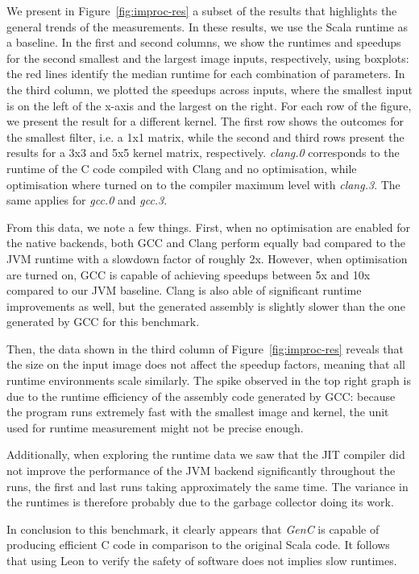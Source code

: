 \documentclass[a4paper,twoside]{article}
\newcommand{\GenC}{\emph{GenC}\xspace}
\newcommand{\RefFig}[1]{Figure~\ref{#1}}
\begin{document}
We present in \RefFig{fig:improc-res} a subset of the results that highlights
the general trends of the measurements. In these results, we use the Scala
runtime as a baseline. In the first and second columns, we show the runtimes and
speedups for the second smallest and the largest image inputs, respectively,
using boxplots: the red lines identify the median runtime for each combination
of parameters. In the third column, we plotted the speedups across inputs, where
the smallest input is on the left of the x-axis and the largest on the right.
For each row of the figure, we present the result for a different kernel. The
first row shows the outcomes for the smallest filter, i.e. a 1x1 matrix, while
the second and third rows present the results for a 3x3 and 5x5 kernel matrix,
respectively. \emph{clang.0} corresponds to the runtime of the C code compiled
with Clang and no optimisation, while optimisation where turned on to the
compiler maximum level with \emph{clang.3}. The same applies for \emph{gcc.0}
and \emph{gcc.3}.

From this data, we note a few things. First, when no optimisation are enabled
for the native backends, both GCC and Clang perform equally bad compared to the
JVM runtime with a slowdown factor of roughly 2x. However, when optimisation are
turned on, GCC is capable of achieving speedups between 5x and 10x compared to
our JVM baseline. Clang is also able of significant runtime improvements as
well, but the generated assembly is slightly slower than the one generated by
GCC for this benchmark.

Then, the data shown in the third column of \RefFig{fig:improc-res} reveals that
the size on the input image does not affect the speedup factors, meaning that
all runtime environments scale similarly. The spike observed in the top right
graph is due to the runtime efficiency of the assembly code generated by GCC:
because the program runs extremely fast with the smallest image and kernel, the
unit used for runtime measurement might not be precise enough.

Additionally, when exploring the runtime data we saw that the JIT compiler did
not improve the performance of the JVM backend significantly throughout the
runs, the first and last runs taking approximately the same time. The variance
in the runtimes is therefore probably due to the garbage collector doing its
work.

In conclusion to this benchmark, it clearly appears that \GenC is capable of
producing efficient C code in comparison to the original Scala code. It follows
that using Leon to verify the safety of software does not implies slow runtimes.
\end{document}
